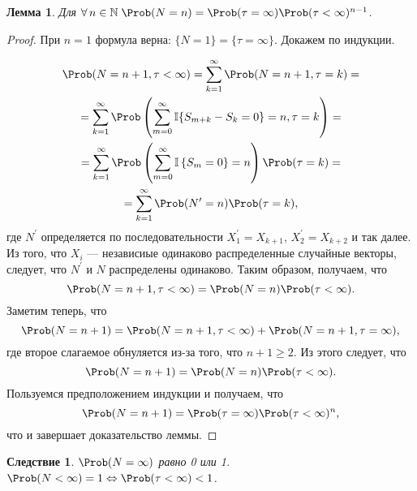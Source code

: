 \documentclass[a4paper]{article}
\theoremstyle{plain}
\newtheorem{lem}[thm]{Лемма}
\newtheorem*{cor}{Следствие}
\theoremstyle{definition}
\theoremstyle{remark}
\begin{document}
\begin{lem}
  Для  $ \forall\, n \in \mathbb{N} \; \Prob(N = n)  =  \Prob(\tau = \infty)\Prob(\tau < \infty)^{n-1}$.
\end{lem}

\begin{proof}
  При $n = 1$ формула верна: $\lbrace N = 1 \rbrace = \lbrace \tau = \infty \rbrace$. Докажем по индукции.

  \begin{multline*}
    \Prob(N = n+1, \tau < \infty) = \sum_{k=1}^{\infty} \Prob(N = n+1, \tau = k) =\\
    = \sum_{k=1}^{\infty} \Prob\left( \sum_{m=0}^{\infty} \mathbb{I} \lbrace S_{m+k} - S_{k} = 0 \rbrace = n, \tau = k\right) =\\
    = \sum_{k=1}^{\infty} \Prob\left( \sum_{m=0}^{\infty} \mathbb{I} \left\lbrace S_{m} = 0 \right\rbrace = n\right)\Prob(\tau = k) =\\
    = \sum_{k=1}^{\infty} \Prob(N^{\prime} = n)\Prob(\tau = k),
  \end{multline*}
  где $N^{\prime}$ определяется по последовательности $X_{1}^{\prime} = X_{k+1}$, $X_{2}^{\prime} = X_{k+2}$ и так далее. Из того, что $X_{i}$ --- независиые одинаково распределенные случайные векторы, следует, что $N^{\prime}$ и $N$ распределены одинаково. Таким образом, получаем, что
  \begin{equation*}
    \Prob(N = n+1, \tau < \infty) = \Prob(N = n)\Prob(\tau < \infty).
  \end{equation*}
  Заметим теперь, что
  \begin{equation*}
    \Prob(N = n+1) = \Prob(N = n+1, \tau < \infty) + \Prob(N = n+1, \tau = \infty),
  \end{equation*}
  где второе слагаемое обнуляется из-за того, что $n+1 \geqslant 2$. Из этого следует, что
  \begin{equation*}
    \Prob(N = n+1) = \Prob(N = n)\Prob(\tau < \infty).
  \end{equation*}
  Пользуемся предположением индукции и получаем, что
  \begin{equation*}
    \Prob(N = n+1) = \Prob(\tau = \infty)\Prob(\tau < \infty)^{n},
  \end{equation*}
  что и завершает доказательство леммы.
\end{proof}

\begin{cor}
  $\Prob(N = \infty)$ равно 0 или 1. $\Prob(N < \infty) = 1 \Leftrightarrow \Prob(\tau < \infty) < 1$.
\end{cor}
\end{document}
